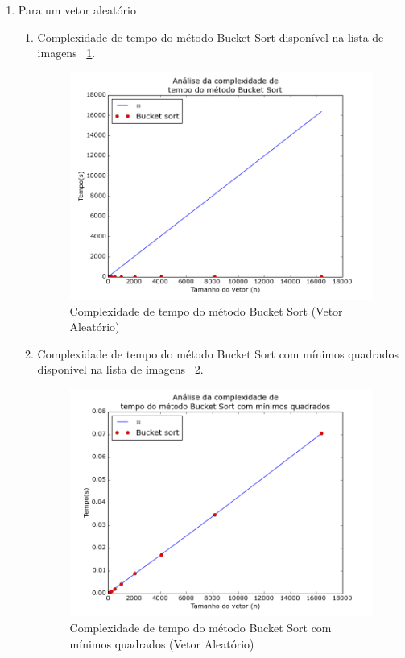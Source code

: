 \documentclass[12pt,a4paper,twoside]{report}
\begin{document}
\begin{enumerate}

	\item Para um vetor aleatório
	\begin{enumerate}
		\item Complexidade de tempo do método Bucket Sort disponível na lista de imagens ~\ref{fig:BucketPlot2A}.
		\begin{figure}[!h]
			\centering
			\includegraphics[scale=0.6]{../imagens/Bucket/Bucket_plot_2_aleatorio.png}
			\caption{Complexidade de tempo do método Bucket Sort (Vetor Aleatório)\label{fig:BucketPlot2A}}
		\end{figure}


		\item Complexidade de tempo do método Bucket Sort com mínimos quadrados disponível na lista de imagens ~\ref{fig:BucketPlot3A}.
		\begin{figure}[!h]
			\centering
			\includegraphics[scale=0.6]{../imagens/Bucket/Bucket_plot_3_aleatorio.png}
			\caption{Complexidade de tempo do método Bucket Sort com mínimos quadrados (Vetor Aleatório) \label{fig:BucketPlot3A}}
		\end{figure}


\end{enumerate}
\end{enumerate}
\end{document}
